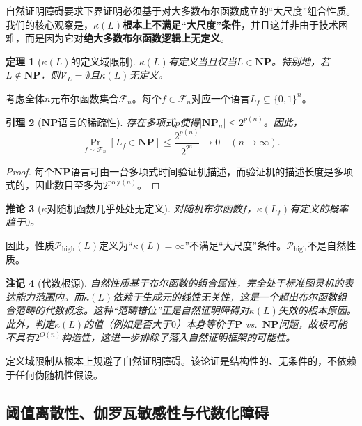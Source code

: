\documentclass{ctexart}
\newtheorem{theorem}{定理}[section]
\newtheorem{lemma}[theorem]{引理}
\newtheorem{corollary}[theorem]{推论}
\newtheorem{remark}[theorem]{注记}
\newtheorem{proof}[theorem]{证明}
\begin{document}
	自然证明障碍要求下界证明必须基于对大多数布尔函数成立的``大尺度''组合性质。我们的核心观察是，$\kappa(L)$\textbf{根本上不满足``大尺度''条件}，并且这并非由于技术困难，而是因为它对\textbf{绝大多数布尔函数逻辑上无定义}。
	
	\begin{theorem}[$\kappa(L)$的定义域限制]\label{thm:domain-restriction}
		$\kappa(L)$有定义当且仅当$L \in \mathbf{NP}$。特别地，若$L \notin \mathbf{NP}$，则$\mathcal{V}_L = \emptyset$且$\kappa(L)$无定义。
	\end{theorem}
	
	考虑全体$n$元布尔函数集合$\mathcal{F}_n$。每个$f\in\mathcal{F}_n$对应一个语言$L_f \subseteq \{0,1\}^n$。
	
	\begin{lemma}[$\mathbf{NP}$语言的稀疏性]\label{lem:np-sparsity}
		存在多项式$p$使得$|\mathbf{NP}_n| \le 2^{p(n)}$。因此，
		\[
		\Pr_{f\sim\mathcal{F}_n}[L_f \in \mathbf{NP}] \le \frac{2^{p(n)}}{2^{2^n}} \to 0 \quad (n\to\infty).
		\]
	\end{lemma}
	\begin{proof}
		每个$\mathbf{NP}$语言可由一台多项式时间验证机描述，而验证机的描述长度是多项式的，因此数目至多为$2^{\mathrm{poly}(n)}$。
	\end{proof}
	
	\begin{corollary}[$\kappa$对随机函数几乎处处无定义]\label{cor:kappa-undefined}
		对随机布尔函数$f$，$\kappa(L_f)$有定义的概率趋于$0$。
	\end{corollary}
	
	因此，性质$\mathcal{P}_{\text{high}}(L)$定义为``$\kappa(L)=\infty$''不满足``大尺度''条件。$\mathcal{P}_{\text{high}}$不是自然性质。
	
	\begin{remark}[代数根源]
		自然性质基于布尔函数的组合属性，完全处于标准图灵机的表达能力范围内。而$\kappa(L)$依赖于生成元的线性无关性，这是一个超出布尔函数组合范畴的代数概念。这种``范畴错位''正是自然证明障碍对$\kappa(L)$失效的根本原因。此外，判定$\kappa(L)$的值（例如是否大于$0$）本身等价于$\mathbf{P}$ vs.\ $\mathbf{NP}$问题，故极可能不具有$2^{O(n)}$构造性，这进一步排除了落入自然证明框架的可能性。
	\end{remark}
	
	定义域限制从根本上规避了自然证明障碍。该论证是结构性的、无条件的，不依赖于任何伪随机性假设。
	
	\subsection{阈值离散性、伽罗瓦敏感性与代数化障碍}
	
\end{document}

